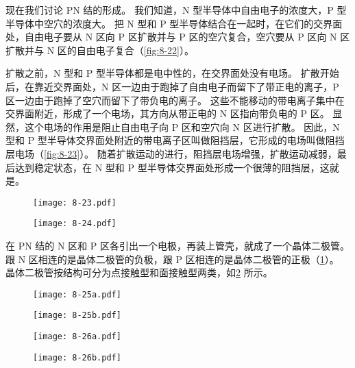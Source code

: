现在我们讨论 PN 结的形成。
我们知道，N 型半导体中自由电子的浓度大，P 型半导体中空穴的浓度大。
把 N 型和 P 型半导体结合在一起时，在它们的交界面处，自由电子要从 N 区向 P 区扩散并与 P 区的空穴复合，空穴要从 P 区向 N 区扩散并与 N 区的自由电子复合（\cref{fig:8-22}）。

扩散之前，N 型和 P 型半导体都是电中性的，在交界面处没有电场。
扩散开始后，在靠近交界面处，N 区一边由于跑掉了自由电子而留下了带正电的离子，P 区一边由于跑掉了空穴而留下了带负电的离子。
这些不能移动的带电离子集中在交界面附近，形成了一个电场，其方向从带正电的 N 区指向带负电的 P 区。
显然，这个电场的作用是阻止自由电子向 P 区和空穴向 N 区进行扩散。
因此，N 型和 P 型半导体交界面处附近的带电离子区叫做阻挡层，它形成的电场叫做阻挡层电场（\cref{fig:8-23}）。
随着扩散运动的进行，阻挡层电场增强，扩散运动减弱，最后达到稳定状态，在 N 型和 P 型半导体交界面处形成一个很薄的阻挡层，这就是。
\begin{figure}
  \begin{minipage}[b]{0.48\linewidth}\centering
    \texttt{[image: 8-23.pdf]}
    \caption{}\label{fig:8-23}
  \end{minipage}
  \begin{minipage}[b]{0.48\linewidth}\centering
    \texttt{[image: 8-24.pdf]}
    \caption{}\label{fig:8-24}
  \end{minipage}
\end{figure}

在 PN 结的 N 区和 P 区各引出一个电极，再装上管壳，就成了一个晶体二极管。
跟 N 区相连的是晶体二极管的负极，跟 P 区相连的是晶体二极管的正极（\cref{fig:8-24}）。
晶体二极管按结构可分为点接触型和面接触型两类，如\cref{fig:8-25} 所示。
\begin{figure}
  \begin{minipage}[b]{0.45\linewidth}\centering
    \texttt{[image: 8-25a.pdf]}
    \label{fig:8-25a}
  \end{minipage}
  \begin{minipage}[b]{0.45\linewidth}\centering
    \texttt{[image: 8-25b.pdf]}
    \label{fig:8-25b}
  \end{minipage}
  \caption{}\label{fig:8-25}
\end{figure}

\begin{figure}
  \begin{minipage}{0.45\linewidth}\centering
    \texttt{[image: 8-26a.pdf]}
    \subcaption{}\label{fig:8-26a}
  \end{minipage}
  \begin{minipage}{0.45\linewidth}\centering
    \texttt{[image: 8-26b.pdf]}
    \subcaption{}\label{fig:8-26b}
  \end{minipage}
  \caption{}\label{fig:8-26}
\end{figure}

